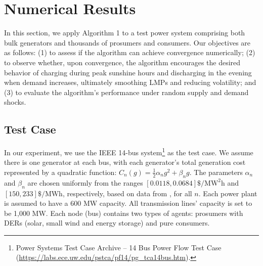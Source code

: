 \documentclass{article}
\theoremstyle{definition}
\theoremstyle{plain}
\begin{document}
\section{Numerical Results}
\label{sec:num}
In this section, we apply Algorithm 1 to a test power system comprising both bulk generators and thousands of prosumers and consumers. Our objectives are as follows: (1) to assess if the algorithm can achieve convergence numerically; (2) to observe whether, upon convergence, the algorithm encourages the desired behavior of charging during peak sunshine hours and discharging in the evening when demand increases, ultimately smoothing LMPs and reducing volatility; and (3) to evaluate the algorithm's performance under random supply and demand shocks.
\subsection{Test Case}
In our experiment, we use the IEEE 14-bus system\footnote{Power Systems Test Case Archive -- 14 Bus Power Flow Test Case (\url{https://labs.ece.uw.edu/pstca/pf14/pg_tca14bus.htm}).} as the test case. We assume there is one generator at each bus, with each generator’s total generation cost represented by a quadratic function: \( C_n(g) = \frac{1}{2}\alpha_n g^2 + \beta_n g \). The parameters \( \alpha_n \) and \( \beta_n \) are chosen uniformly from the ranges \([0.0118, 0.0684]\$/\text{MW}^2\text{h}\) and \([150, 233]\$/\text{MWh}\), respectively, based on data from \cite{krishnamurthy20158}, for all $n$. Each power plant is assumed to have a $600$ MW capacity. 
All transmission lines' capacity is set to be 1,000 MW. Each node (bus) contains two types of agents: prosumers with DERs (solar, small wind and energy storage) and pure consumers. 
\end{document}
